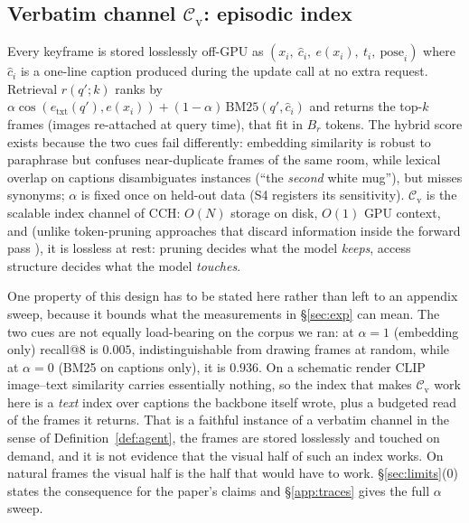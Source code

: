 \documentclass[10pt]{article}
\theoremstyle{definition}
\theoremstyle{plain}
\newcommand{\cv}{\mathcal{C}_{\mathrm{v}}}
\begin{document}
\subsection{Verbatim channel $\cv$: episodic index}
Every keyframe is stored losslessly off-GPU as $(x_i,\ \hat c_i,\ e(x_i),\ t_i,\ \mathrm{pose}_i)$ where $\hat c_i$ is a one-line caption produced during the update call at no extra request. Retrieval $r(q';k)$ ranks by $\alpha\cos(e_{\mathrm{txt}}(q'),e(x_i))+(1-\alpha)\,\mathrm{BM25}(q',\hat c_i)$ and returns the top-$k$ frames (images re-attached at query time), that fit in $B_r$ tokens. The hybrid score exists because the two cues fail differently: embedding similarity is robust to paraphrase but confuses near-duplicate frames of the same room, while lexical overlap on captions disambiguates instances (``the \emph{second} white mug''), but misses synonyms; $\alpha$ is fixed once on held-out data (S4 registers its sensitivity). $\cv$ is the scalable index channel of CCH: $O(N)$ storage on disk, $O(1)$ GPU context, and (unlike token-pruning approaches that discard information inside the forward pass \citep{fastv,prumerge,tosa}), it is lossless at rest: pruning decides what the model \emph{keeps}, access structure decides what the model \emph{touches}.

One property of this design has to be stated here rather than left to an appendix sweep, because
it bounds what the measurements in \S\ref{sec:exp} can mean. The two cues are not
equally load-bearing on the corpus we ran: at $\alpha{=}1$ (embedding only) recall@$8$ is
$0.005$, indistinguishable from drawing frames at random, while at $\alpha{=}0$ (BM25 on
captions only), it is $0.936$. On a schematic render CLIP image--text similarity carries
essentially nothing, so the index that makes $\cv$ work here is a \emph{text} index over
captions the backbone itself wrote, plus a budgeted read of the frames it returns. That is a
faithful instance of a verbatim channel in the sense of Definition~\ref{def:agent}, the
frames are stored losslessly and touched on demand, and it is not evidence that the visual
half of such an index works. On natural frames the visual half is the half that would have to
work. \S\ref{sec:limits}(0) states the consequence for the paper's claims and
\S\ref{app:traces} gives the full $\alpha$ sweep.
\end{document}
